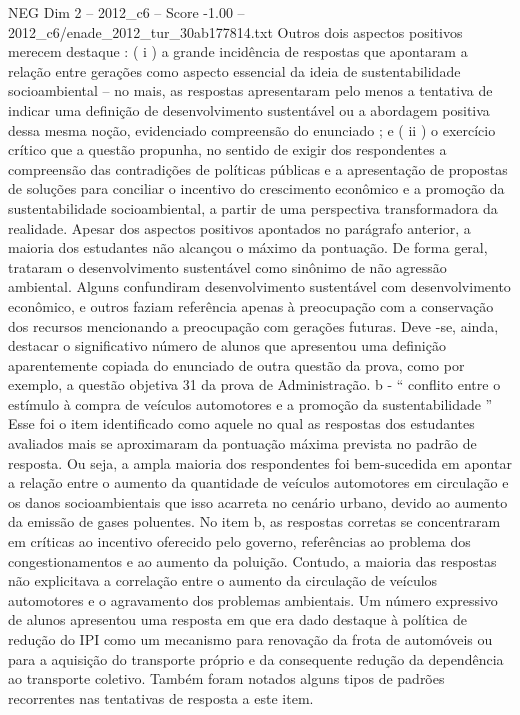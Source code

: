 \begin{textsample}{NEG Dim 2 – 2012\_c6 – Score -1.00 – 2012\_c6/enade\_2012\_tur\_30ab177814.txt}
Outros dois aspectos positivos merecem destaque : ( i ) a grande incidência de respostas que apontaram a relação entre gerações como aspecto essencial da ideia de sustentabilidade socioambiental – no mais, as respostas apresentaram pelo menos a tentativa de indicar uma definição de desenvolvimento sustentável ou a abordagem positiva dessa mesma noção, evidenciado compreensão do enunciado ; e ( ii ) o exercício crítico que a questão propunha, no sentido de exigir dos respondentes a compreensão das contradições de políticas públicas e a apresentação de propostas de soluções para conciliar o incentivo do crescimento econômico e a promoção da sustentabilidade socioambiental, a partir de uma perspectiva transformadora da realidade.
Apesar dos aspectos positivos apontados no parágrafo anterior, a maioria dos estudantes não alcançou o máximo da pontuação.
De forma geral, trataram o desenvolvimento sustentável como sinônimo de não agressão ambiental.
Alguns confundiram desenvolvimento sustentável com desenvolvimento econômico, e outros faziam referência apenas à preocupação com a conservação dos recursos mencionando a preocupação com gerações futuras.
Deve -se, ainda, destacar o significativo número de alunos que apresentou uma definição aparentemente copiada do enunciado de outra questão da prova, como por exemplo, a questão objetiva 31 da prova de Administração. b - “ conflito entre o estímulo à compra de veículos automotores e a promoção da sustentabilidade ” Esse foi o item identificado como aquele no qual as respostas dos estudantes avaliados mais se aproximaram da pontuação máxima prevista no padrão de resposta.
Ou seja, a ampla maioria dos respondentes foi bem-sucedida em apontar a relação entre o aumento da quantidade de veículos automotores em circulação e os danos socioambientais que isso acarreta no cenário urbano, devido ao aumento da emissão de gases poluentes.
No item b, as respostas corretas se concentraram em críticas ao incentivo oferecido pelo governo, referências ao problema dos congestionamentos e ao aumento da poluição.
Contudo, a maioria das respostas não explicitava a correlação entre o aumento da circulação de veículos automotores e o agravamento dos problemas ambientais.
Um número expressivo de alunos apresentou uma resposta em que era dado destaque à política de redução do IPI como um mecanismo para renovação da frota de automóveis ou para a aquisição do transporte próprio e da consequente redução da dependência ao transporte coletivo.
Também foram notados alguns tipos de padrões recorrentes nas tentativas de resposta a este item.

\end{textsample}
